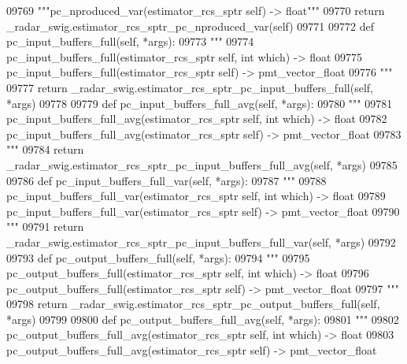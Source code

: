 \begin{DoxyCode}
{{{{{{{{{{{{{{{{{{{{{{{{{{{{{{{09769         \textcolor{stringliteral}{"""pc\_nproduced\_var(estimator\_rcs\_sptr self) -> float"""}
09770         \textcolor{keywordflow}{return} \_radar\_swig.estimator\_rcs\_sptr\_pc\_nproduced\_var(self)
09771 
09772     \textcolor{keyword}{def }pc_input_buffers_full(self, *args):
09773         \textcolor{stringliteral}{"""}
09774 \textcolor{stringliteral}{        pc\_input\_buffers\_full(estimator\_rcs\_sptr self, int which) -> float}
09775 \textcolor{stringliteral}{        pc\_input\_buffers\_full(estimator\_rcs\_sptr self) -> pmt\_vector\_float}
09776 \textcolor{stringliteral}{        """}
09777         \textcolor{keywordflow}{return} \_radar\_swig.estimator\_rcs\_sptr\_pc\_input\_buffers\_full(self, *args)
09778 
09779     \textcolor{keyword}{def }pc_input_buffers_full_avg(self, *args):
09780         \textcolor{stringliteral}{"""}
09781 \textcolor{stringliteral}{        pc\_input\_buffers\_full\_avg(estimator\_rcs\_sptr self, int which) -> float}
09782 \textcolor{stringliteral}{        pc\_input\_buffers\_full\_avg(estimator\_rcs\_sptr self) -> pmt\_vector\_float}
09783 \textcolor{stringliteral}{        """}
09784         \textcolor{keywordflow}{return} \_radar\_swig.estimator\_rcs\_sptr\_pc\_input\_buffers\_full\_avg(self, *args)
09785 
09786     \textcolor{keyword}{def }pc_input_buffers_full_var(self, *args):
09787         \textcolor{stringliteral}{"""}
09788 \textcolor{stringliteral}{        pc\_input\_buffers\_full\_var(estimator\_rcs\_sptr self, int which) -> float}
09789 \textcolor{stringliteral}{        pc\_input\_buffers\_full\_var(estimator\_rcs\_sptr self) -> pmt\_vector\_float}
09790 \textcolor{stringliteral}{        """}
09791         \textcolor{keywordflow}{return} \_radar\_swig.estimator\_rcs\_sptr\_pc\_input\_buffers\_full\_var(self, *args)
09792 
09793     \textcolor{keyword}{def }pc_output_buffers_full(self, *args):
09794         \textcolor{stringliteral}{"""}
09795 \textcolor{stringliteral}{        pc\_output\_buffers\_full(estimator\_rcs\_sptr self, int which) -> float}
09796 \textcolor{stringliteral}{        pc\_output\_buffers\_full(estimator\_rcs\_sptr self) -> pmt\_vector\_float}
09797 \textcolor{stringliteral}{        """}
09798         \textcolor{keywordflow}{return} \_radar\_swig.estimator\_rcs\_sptr\_pc\_output\_buffers\_full(self, *args)
09799 
09800     \textcolor{keyword}{def }pc_output_buffers_full_avg(self, *args):
09801         \textcolor{stringliteral}{"""}
09802 \textcolor{stringliteral}{        pc\_output\_buffers\_full\_avg(estimator\_rcs\_sptr self, int which) -> float}
09803 \textcolor{stringliteral}{        pc\_output\_buffers\_full\_avg(estimator\_rcs\_sptr self) -> pmt\_vector\_float}
}}}}}}}}}}}}}}}}}}}}}}}}}}}}}}}
\end{DoxyCode}
